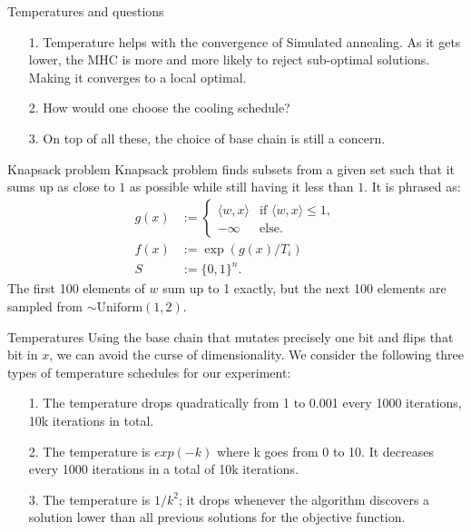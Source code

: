 \documentclass[11pt]{beamer}
\begin{document}
    \begin{frame}{Temperatures and questions}
        \begin{itemize}
            \item [1.] Temperature helps with the convergence of Simulated annealing. As it gets lower, the MHC is more and more likely to reject sub-optimal solutions. Making it converges to a local optimal. 
            \item [2.] How would one choose the cooling schedule? 
            \item [3.] On top of all these, the choice of base chain is still a concern. 
        \end{itemize}
    \end{frame}
    \begin{frame}{Knapsack problem}
        Knapsack problem finds subsets from a given set such that it sums up as close to $1$ as possible while still having it less than $1$. It is phrased as: 
        \begin{align*}
            g(x) &:= \begin{cases}
                \langle w, x\rangle & \text{if }\langle w, x\rangle\le 1,
                \\
                -\infty & \text{else}. 
            \end{cases}
            \\
            f(x) &:= \exp(g(x)/T_i)
            \\
            S &:= \{0, 1\}^n. 
        \end{align*}
        The first 100 elements of $w$ sum up to 1 exactly, but the next 100 elements are sampled from $\sim \text{Uniform}(1, 2)$. 
    \end{frame}
    \begin{frame}{Temperatures}
        Using the base chain that mutates precisely one bit and flips that bit in $x$, we can avoid the curse of dimensionality. We consider the following three types of temperature schedules for our experiment: 
        \begin{itemize}
            \item [1.] The temperature drops quadratically from 1 to 0.001 every 1000 iterations, 10k iterations in total. 
            \item [2.] The temperature is $exp(-k)$ where k goes from 0 to 10. It decreases every 1000 iterations in a total of 10k iterations. 
            \item [3.] The temperature is $1/k^2$; it drops whenever the algorithm discovers a solution lower than all previous solutions for the objective function.
        \end{itemize}
    \end{frame}
\end{document}
